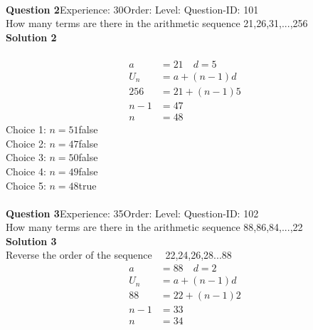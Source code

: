 \documentclass{article}
\begin{document}
\\[4pt]
\noindent\textbf{Question 2}\hspace{20pt}Experience: 30\hspace{20pt}Order: \hspace{20pt}Level: \hspace{20pt}Question-ID: 101\\[2pt]
How many terms are there in the arithmetic sequence 21,26,31,...,256\\[4pt]
\noindent\textbf{Solution 2}\\[2pt]
\\[-35pt]\begin{align*}
a&=21 \quad d=5\\[2pt]
U_n&=a+(n-1)d\\[2pt]
256&=21+(n-1)5\\[2pt]
n-1&=47\\[2pt]
n&=48
\end{align*}
Choice 1: \hspace{20pt}$n=51$\hspace{20pt}false\\
Choice 2: \hspace{20pt}$n=47$\hspace{20pt}false\\
Choice 3: \hspace{20pt}$n=50$\hspace{20pt}false\\
Choice 4: \hspace{20pt}$n=49$\hspace{20pt}false\\
Choice 5: \hspace{20pt}$n=48$\hspace{20pt}true\\
\\[4pt]
\noindent\textbf{Question 3}\hspace{20pt}Experience: 35\hspace{20pt}Order: \hspace{20pt}Level: \hspace{20pt}Question-ID: 102\\[2pt]
How many terms are there in the arithmetic sequence 88,86,84,...,22\\[4pt]
\noindent\textbf{Solution 3}\\[2pt]
Reverse the order of the sequence$\quad$ 22,24,26,28...88
\begin{align*}
a&=88 \quad d=2\\[2pt]
U_n&=a+(n-1)d\\[2pt]
88&=22+(n-1)2\\[2pt]
n-1&=33\\[2pt]
n&=34\\[-100pt]
\end{align*}
\end{document}
